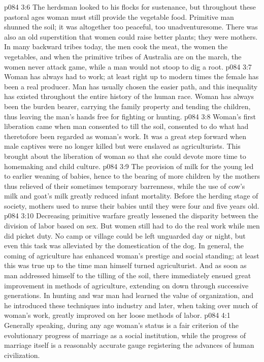 \pc \vs p084 3:6 The herdsman looked to his flocks for sustenance, but throughout these pastoral ages woman must still provide the vegetable food. Primitive man shunned the soil; it was altogether too peaceful, too unadventuresome. There was also an old superstition that women could raise better plants; they were mothers. In many backward tribes today, the men cook the meat, the women the vegetables, and when the primitive tribes of Australia are on the march, the women never attack game, while a man would not stoop to dig a root.
\vs p084 3:7 Woman has always had to work; at least right up to modern times the female has been a real producer. Man has usually chosen the easier path, and this inequality has existed throughout the entire history of the human race. Woman has always been the burden bearer, carrying the family property and tending the children, thus leaving the man’s hands free for fighting or hunting.
\vs p084 3:8 Woman’s first liberation came when man consented to till the soil, consented to do what had theretofore been regarded as woman’s work. It was a great step forward when male captives were no longer killed but were enslaved as agriculturists. This brought about the liberation of woman so that she could devote more time to homemaking and child culture.
\vs p084 3:9 The provision of milk for the young led to earlier weaning of babies, hence to the bearing of more children by the mothers thus relieved of their sometimes temporary barrenness, while the use of cow’s milk and goat’s milk greatly reduced infant mortality. Before the herding stage of society, mothers used to nurse their babies until they were four and five years old.
\vs p084 3:10 Decreasing primitive warfare greatly lessened the disparity between the division of labor based on sex. But women still had to do the real work while men did picket duty. No camp or village could be left unguarded day or night, but even this task was alleviated by the domestication of the dog. In general, the coming of agriculture has enhanced woman’s prestige and social standing; at least this was true up to the time man himself turned agriculturist. And as soon as man addressed himself to the tilling of the soil, there immediately ensued great improvement in methods of agriculture, extending on down through successive generations. In hunting and war man had learned the value of organization, and he introduced these techniques into industry and later, when taking over much of woman’s work, greatly improved on her loose methods of labor.
\vs p084 4:1 Generally speaking, during any age woman’s status is a fair criterion of the evolutionary progress of marriage as a social institution, while the progress of marriage itself is a reasonably accurate gauge registering the advances of human civilization.
